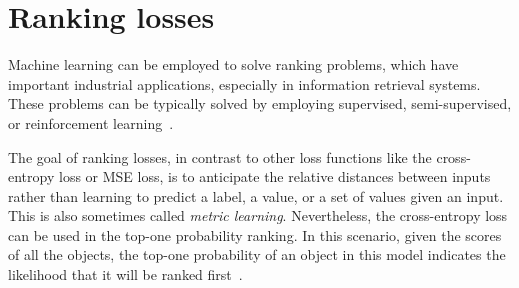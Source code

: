 \documentclass[sn-mathphys-num]{sn-jnl}%
\begin{document}




\color{black}
    
\section{Ranking losses} \label{sec:ranking}  

    Machine learning can be employed to solve ranking problems, which have important industrial applications, especially in information retrieval systems. These problems can be typically solved by employing supervised, semi-supervised, or reinforcement learning~\cite{bromley1993signature,hoffer2015deep}.
    
    The goal of ranking losses, in contrast to other loss functions like the cross-entropy loss or MSE loss, is to anticipate the relative distances between inputs rather than learning to predict a label, a value, or a set of values given an input. This is also sometimes called \emph{metric learning}. Nevertheless, the cross-entropy loss can be used in the top-one probability ranking. In this scenario, given the scores of all the objects, the top-one probability of an object in this model indicates the likelihood that it will be ranked first~\cite{cao2007learning}. 
\end{document}

